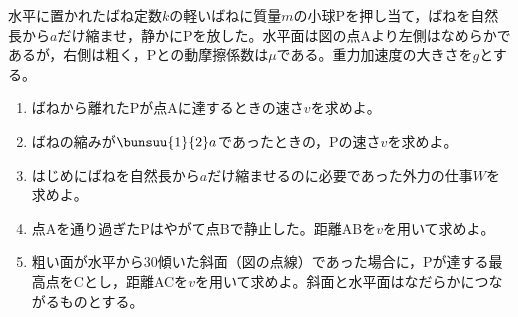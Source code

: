 \item
    \begin{mawarikomi}{180pt}{}
        水平に置かれたばね定数$k$の軽いばねに質量$m$の小球Pを押し当て，ばねを自然長から$a$だけ縮ませ，静かにPを放した。水平面は図の点Aより左側はなめらかであるが，右側は粗く，Pとの動摩擦係数は$\mu $である。重力加速度の大きさを$g$とする。
        \begin{enumerate}
            \item ばねから離れたPが点Aに達するときの速さ$v$を求めよ。
            \item ばねの縮みが$\bunsuu{1}{2}a$であったときの，Pの速さ$v$を求めよ。
            \item はじめにばねを自然長から$a$だけ縮ませるのに必要であった外力の仕事$W$を求めよ。
            \item 点Aを通り過ぎたPはやがて点Bで静止した。距離ABを$v$を用いて求めよ。
            \item 粗い面が水平から30\Deg 傾いた斜面（図の点線）であった場合に，Pが達する最高点をCとし，距離ACを$v$を用いて求めよ。斜面と水平面はなだらかにつながるものとする。
        \end{enumerate}
    \end{mawarikomi}